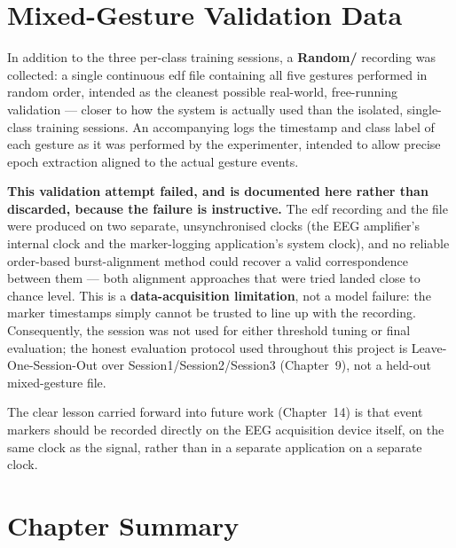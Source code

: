 \section{Mixed-Gesture Validation Data}
\label{sec:dc_devtest}

In addition to the three per-class training sessions, a
\textbf{Random/} recording was collected: a single continuous
\acrshort{edf} file containing all five gestures performed in
random order, intended as the cleanest possible real-world,
free-running validation --- closer to how the system is actually
used than the isolated, single-class training sessions. An
accompanying  logs the timestamp and class
label of each gesture as it was performed by the experimenter,
intended to allow precise epoch extraction aligned to the actual
gesture events.

\textbf{This validation attempt failed, and is documented here
rather than discarded, because the failure is instructive.} The
\acrshort{edf} recording and the  file were
produced on two separate, unsynchronised clocks (the EEG
amplifier's internal clock and the marker-logging application's
system clock), and no reliable order-based burst-alignment method
could recover a valid correspondence between them --- both
alignment approaches that were tried landed close to chance
level. This is a \textbf{data-acquisition limitation}, not a
model failure: the marker timestamps simply cannot be trusted to
line up with the recording. Consequently, the 
session was not used for either threshold tuning or final
evaluation; the honest evaluation protocol used throughout this
project is Leave-One-Session-Out over Session1/Session2/Session3
(Chapter~9), not a held-out mixed-gesture file.

The clear lesson carried forward into future work (Chapter~14)
is that event markers should be recorded directly on the EEG
acquisition device itself, on the same clock as the signal,
rather than in a separate application on a separate clock.

\section{Chapter Summary}
\label{sec:dc_summary}

